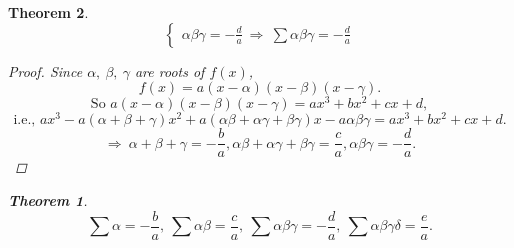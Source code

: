 \documentclass[12pt, a4paper]{article}
\newtheorem{theorem}{Theorem}[subsection]
\newtheorem{proof}{Proof}[subsection]
\begin{document}
\begin{enumerate}
\begin{theorem}
$${{\begin{cases}
            \displaystyle\alpha\beta\gamma=-\frac{d}{a}\ \Rightarrow\ \sum\alpha\beta\gamma=-\frac{d}{a}
        \end{cases}}}$$
        \begin{proof}
            Since $\alpha,\ \beta,\ \gamma$ are roots of $f(x)$, 
            $$f(x)=a(x-\alpha)(x-\beta)(x-\gamma).$$
            $$\text{So } a(x-\alpha)(x-\beta)(x-\gamma)=ax^3+bx^2+cx+d,$$
            $$\text{i.e., }ax^3-a(\alpha+\beta+\gamma)x^2+a(\alpha\beta+\alpha\gamma+\beta\gamma)x-a\alpha\beta\gamma=ax^3+bx^2+cx+d.$$
            $$\Rightarrow\ \alpha+\beta+\gamma=-\frac{b}{a}, \alpha\beta+\alpha\gamma+\beta\gamma=\frac{c}{a}, \alpha\beta\gamma=-\frac{d}{a}.$$
        \end{proof}
        \begin{theorem}
            $$\sum\alpha=-\frac{b}{a},\ \sum\alpha\beta=\frac{c}{a},\ \sum\alpha\beta\gamma=-\frac{d}{a},\ \sum\alpha\beta\gamma\delta=\frac{e}{a}.$$
        \end{theorem}
    \end{theorem}
\end{enumerate}
\end{document}
